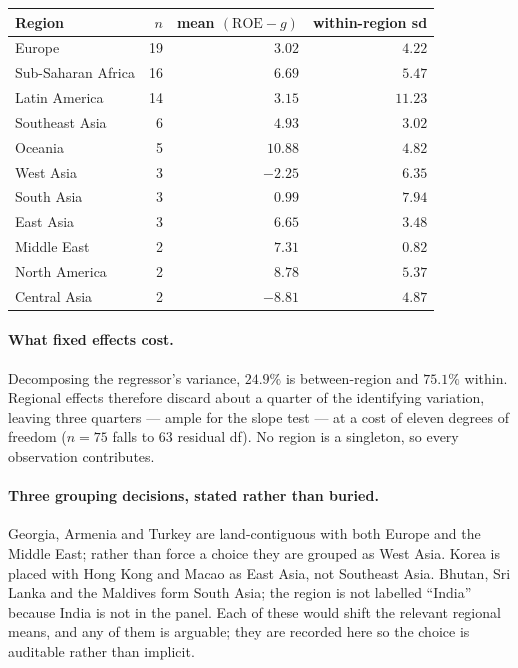 \documentclass[11pt]{article}
\begin{document}
\begin{center}
\begin{tabular}{@{}lrrr@{}}
\toprule
Region & $n$ & mean $(\mathrm{ROE}-g)$ & within-region sd \\
\midrule
Europe        & 19 & $3.02$  & $4.22$ \\
Sub-Saharan Africa & 16 & $6.69$  & $5.47$ \\
Latin America & 14 & $3.15$  & $11.23$ \\
Southeast Asia & 6 & $4.93$  & $3.02$ \\
Oceania       & 5  & $10.88$ & $4.82$ \\
West Asia     & 3  & $-2.25$ & $6.35$ \\
South Asia    & 3  & $0.99$  & $7.94$ \\
East Asia     & 3  & $6.65$  & $3.48$ \\
Middle East   & 2  & $7.31$  & $0.82$ \\
North America & 2  & $8.78$  & $5.37$ \\
Central Asia  & 2  & $-8.81$ & $4.87$ \\
\bottomrule
\end{tabular}
\end{center}

\paragraph{What fixed effects cost.} Decomposing the regressor's variance,
$24.9\%$ is between-region and $75.1\%$ within. Regional effects therefore
discard about a quarter of the identifying variation, leaving three
quarters --- ample for the slope test --- at a cost of eleven degrees of
freedom ($n=75$ falls to $63$ residual df). No region is a singleton, so
every observation contributes.

\paragraph{Three grouping decisions, stated rather than buried.} Georgia,
Armenia and Turkey are land-contiguous with both Europe and the Middle
East; rather than force a choice they are grouped as West Asia. Korea is
placed with Hong Kong and Macao as East Asia, not Southeast Asia. Bhutan,
Sri Lanka and the Maldives form South Asia; the region is not labelled
``India'' because India is not in the panel. Each of these would shift the
relevant regional means, and any of them is arguable; they are recorded here
so the choice is auditable rather than implicit.
\end{document}
